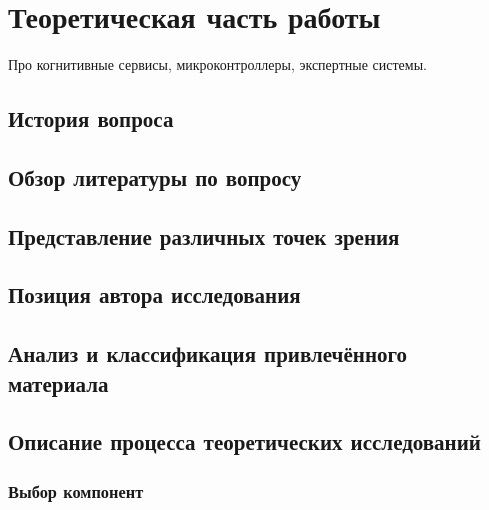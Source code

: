 \chapter{Теоретическая часть работы}

Про когнитивные сервисы, микроконтроллеры, экспертные системы.

\section{История вопроса}
\section{Обзор литературы по вопросу}
\section{Представление различных точек зрения}
\section{Позиция автора исследования}
\section{Анализ и классификация привлечённого материала}
\section{Описание процесса теоретических исследований}
\subsection{Выбор компонент}
